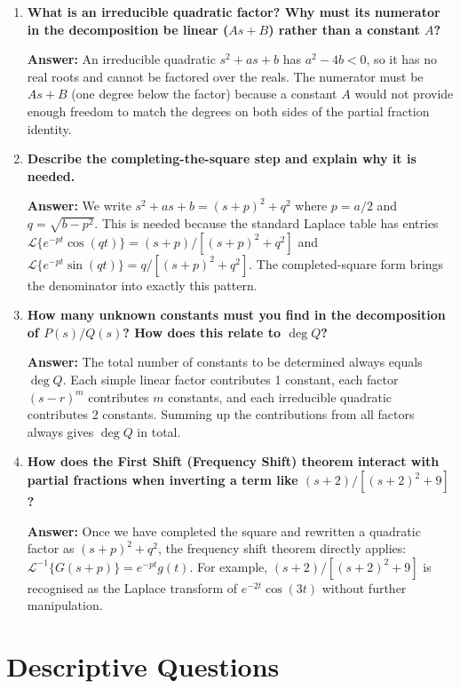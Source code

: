 \documentclass[12pt,a4paper]{article}
\begin{document}
\begin{enumerate}[label=\textbf{Q\arabic*.}, leftmargin=*, itemsep=1em]
\item \textbf{What is an irreducible quadratic factor? Why must its numerator
  in the decomposition be linear ($As+B$) rather than a constant $A$?}

  \textbf{Answer:} An irreducible quadratic $s^2+as+b$ has $a^2-4b<0$, so
  it has no real roots and cannot be factored over the reals. The numerator
  must be $As+B$ (one degree below the factor) because a constant $A$ would
  not provide enough freedom to match the degrees on both sides of the
  partial fraction identity.

\item \textbf{Describe the completing-the-square step and explain why it is
  needed.}

  \textbf{Answer:} We write $s^2+as+b=(s+p)^2+q^2$ where $p=a/2$ and
  $q=\sqrt{b-p^2}$. This is needed because the standard Laplace table has
  entries $\mathcal{L}\{e^{-pt}\cos(qt)\}=(s+p)/[(s+p)^2+q^2]$ and
  $\mathcal{L}\{e^{-pt}\sin(qt)\}=q/[(s+p)^2+q^2]$. The completed-square
  form brings the denominator into exactly this pattern.

\item \textbf{How many unknown constants must you find in the decomposition
  of $P(s)/Q(s)$? How does this relate to $\deg Q$?}

  \textbf{Answer:} The total number of constants to be determined always
  equals $\deg Q$. Each simple linear factor contributes 1 constant, each
  factor $(s-r)^m$ contributes $m$ constants, and each irreducible quadratic
  contributes 2 constants. Summing up the contributions from all factors
  always gives $\deg Q$ in total.

\item \textbf{How does the First Shift (Frequency Shift) theorem interact
  with partial fractions when inverting a term like $(s+2)/[(s+2)^2+9]$?}

  \textbf{Answer:} Once we have completed the square and rewritten a
  quadratic factor as $(s+p)^2+q^2$, the frequency shift theorem directly
  applies: $\mathcal{L}^{-1}\{G(s+p)\}=e^{-pt}g(t)$. For example,
  $(s+2)/[(s+2)^2+9]$ is recognised as the Laplace transform of
  $e^{-2t}\cos(3t)$ without further manipulation.

\end{enumerate}

\section{Descriptive Questions}
\end{document}
